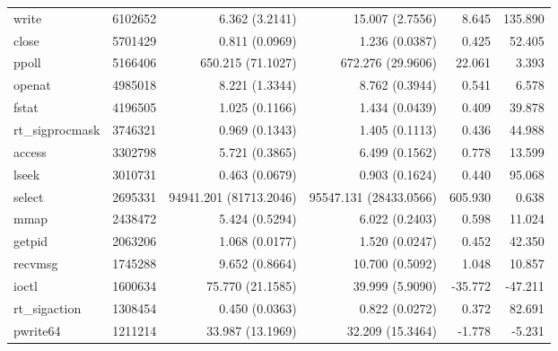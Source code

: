 \begin{longtable}{>{\ttfamily}lrrrrr}
                          write &    6102652 &           6.362 (3.2141) &          15.007 (2.7556) &           8.645 &      135.890 \\
                          close &    5701429 &           0.811 (0.0969) &           1.236 (0.0387) &           0.425 &       52.405 \\
                          ppoll &    5166406 &        650.215 (71.1027) &        672.276 (29.9606) &          22.061 &        3.393 \\
                         openat &    4985018 &           8.221 (1.3344) &           8.762 (0.3944) &           0.541 &        6.578 \\
                          fstat &    4196505 &           1.025 (0.1166) &           1.434 (0.0439) &           0.409 &       39.878 \\
                rt\_sigprocmask &    3746321 &           0.969 (0.1343) &           1.405 (0.1113) &           0.436 &       44.988 \\
                         access &    3302798 &           5.721 (0.3865) &           6.499 (0.1562) &           0.778 &       13.599 \\
                          lseek &    3010731 &           0.463 (0.0679) &           0.903 (0.1624) &           0.440 &       95.068 \\
                         select &    2695331 &   94941.201 (81713.2046) &   95547.131 (28433.0566) &         605.930 &        0.638 \\
                           mmap &    2438472 &           5.424 (0.5294) &           6.022 (0.2403) &           0.598 &       11.024 \\
                         getpid &    2063206 &           1.068 (0.0177) &           1.520 (0.0247) &           0.452 &       42.350 \\
                        recvmsg &    1745288 &           9.652 (0.8664) &          10.700 (0.5092) &           1.048 &       10.857 \\
                          ioctl &    1600634 &         75.770 (21.1585) &          39.999 (5.9090) &         -35.772 &      -47.211 \\
                  rt\_sigaction &    1308454 &           0.450 (0.0363) &           0.822 (0.0272) &           0.372 &       82.691 \\
                       pwrite64 &    1211214 &         33.987 (13.1969) &         32.209 (15.3464) &          -1.778 &       -5.231 \\

\end{longtable}
